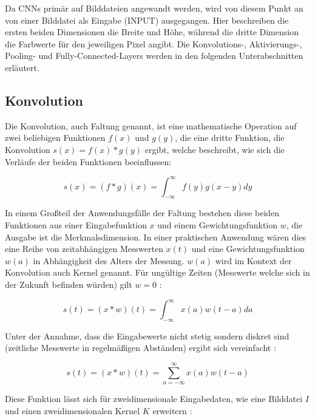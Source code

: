 Da CNNs primär auf Bilddateien angewandt werden, wird von diesem Punkt an von einer Bilddatei als Eingabe ($\mathrm{INPUT}$) ausgegangen. Hier beschreiben die ersten beiden Dimensionen die Breite und Höhe, während die dritte Dimension die Farbwerte für den jeweiligen Pixel angibt. Die Konvolutions-, Aktivierungs-, Pooling- und Fully-Connected-Layers werden in den folgenden Unterabschnitten erläutert.

\subsection{Konvolution}
\label{ssec:convolution}

Die Konvolution, auch Faltung genannt, ist eine mathematische Operation auf zwei beliebigen Funktionen $f(x)$ und $g(y)$, die eine dritte Funktion, die Konvolution $s(x) = f(x)*g(y)$ ergibt, welche beschreibt, wie sich die Verläufe der beiden Funktionen beeinflussen:

\begin{equation}
s(x) = (f*g)(x) = \int_{-\infty}^{\infty} f(y)g(x-y)dy
\end{equation}

In einem Großteil der Anwendungsfälle der Faltung bestehen diese beiden Funktionen aus einer Eingabefunktion $x$ und einem Gewichtungsfunktion $w$, die Ausgabe ist die Merkmalsdimension. In einer praktischen Anwendung wären dies \bspw eine Reihe von zeitabhängigen Messwerten $x(t)$ und eine Gewichtungsfunktion $w(a)$ in Abhängigkeit des Alters der Messung. $w(a)$ wird im Kontext der Konvolution auch Kernel genannt. Für ungültige Zeiten (\bspw Messwerte welche sich in der Zukunft befinden würden) gilt $w=0$ \cite[Kap.~9]{deeplearning_16}:

\begin{equation}
s(t) = (x*w)(t) = \int_{-\infty}^{\infty} x(a)w(t-a)da
\end{equation}

Unter der Annahme, dass die Eingabewerte nicht stetig sondern diskret sind (\bspw zeitliche Messwerte in regelmäßigen Abständen) ergibt sich vereinfacht \cite[Kap.~9]{deeplearning_16}:

\begin{equation}
s(t) = (x*w)(t) = \sum_{a=-\infty}^{\infty}x(a)w(t-a)
\end{equation}

Diese Funktion lässt sich für zweidimensionale Eingabedaten, wie \zB eine Bilddatei $I$ und einen zweidimensionalen Kernel $K$ erweitern \cite[Kap.~9]{deeplearning_16}:

